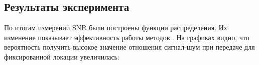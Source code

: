 \documentclass[a4paper,12pt,oneside]{scrartcl}
\begin{document}
\subsection{Результаты эксперимента}

По итогам измерений SNR были построены функции распределения. Их изменение показывает эффективность работы методов \cite{B1}. На графиках видно, что вероятность получить высокое значение отношения сигнал-шум при передаче для фиксированной локации увеличилась:
\begin{figure}[!htb]
\begin{minipage}[h]{0.49\linewidth}
 \\
\end{minipage}
\begin{minipage}[h]{0.49\linewidth}
 \\
\end{minipage}
\vfill
\begin{minipage}[h]{0.49\linewidth}

\end{minipage}
\end{figure}
\end{document}
